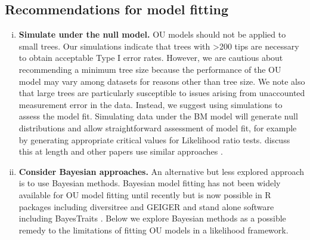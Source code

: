 \documentclass[a4paper,12pt]{article}
\begin{document}
  \subsection{Recommendations for model fitting}
    \begin{enumerate}[(i)]
      \item \textbf{Simulate under the null model.}
      OU models should not be applied to small trees. 
      Our simulations indicate that trees with \textgreater 200 tips are necessary to obtain acceptable Type I error rates. 
      However, we are cautious about recommending a minimum tree size because the performance of the OU model may vary among datasets for reasons other than tree size. 
      We note also that large trees are particularly susceptible to issues arising from unaccounted measurement error in the data. 
      Instead, we suggest using simulations to assess the model fit. 
      Simulating data under the BM model will generate null distributions \citep[e.g.,][]{boettiger2012your} and allow straightforward assessment of model fit, for example by generating appropriate critical values for Likelihood ratio tests. 
      \citet{boettiger2012your} discuss this at length and other papers use similar approaches \citep[e.g.,][]{freckleton2002phylogenetic, martins1991phylogenetic}.
    
      \item \textbf{Consider Bayesian approaches.}
      An alternative but less explored approach is to use Bayesian methods. 
      Bayesian model fitting has not been widely available for OU model fitting until recently but is now possible in R packages including diversitree \citep{FitzJohn:2012aa} and GEIGER \citep[the Single Stationary Peak model in \texttt{fitContinuousMCMC};][]{Harmon:2008aa} and stand alone software including BayesTraits \citep{pagel2013bayestraits}.
      Below we explore Bayesian methods as a possible remedy to the limitations of fitting OU models in a likelihood framework.
	

\end{enumerate}
\end{document}
